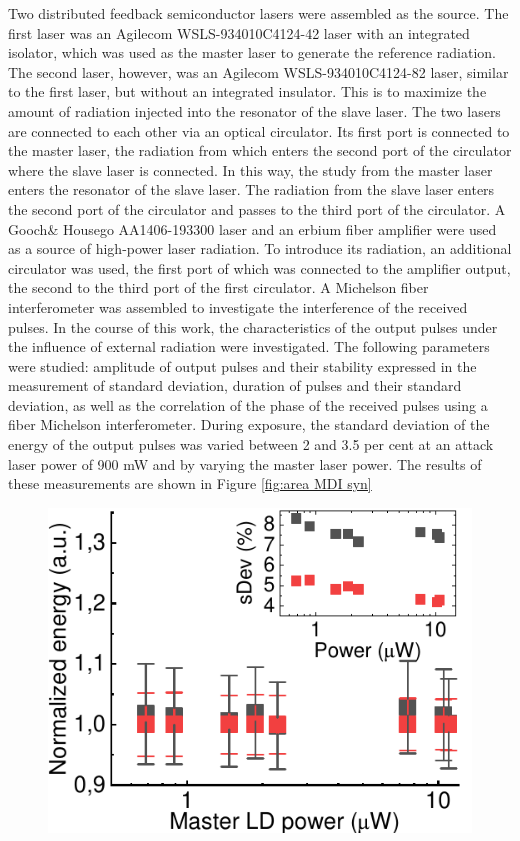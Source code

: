{Two distributed feedback semiconductor lasers were assembled as the source. The first laser was an Agilecom WSLS-934010C4124-42 laser with an integrated isolator, which was used as the master laser to generate the reference radiation. The second laser, however, was an Agilecom WSLS-934010C4124-82 laser, similar to the first laser, but without an integrated insulator. This is to maximize the amount of radiation injected into the resonator of the slave laser. The two lasers are connected to each other via an optical circulator. Its first port is connected to the master laser, the radiation from which enters the second port of the circulator where the slave laser is connected. In this way, the study from the master laser enters the resonator of the slave laser. The radiation from the slave laser enters the second port of the circulator and passes to the third port of the circulator. A Gooch\& Housego AA1406-193300 laser and an erbium fiber amplifier were used as a source of high-power laser radiation. To introduce its radiation, an additional circulator was used, the first port of which was connected to the amplifier output, the second to the third port of the first circulator. A Michelson fiber interferometer was assembled to investigate the interference of the received pulses.
\newline In the course of this work, the characteristics of the output pulses under the influence of external radiation were investigated. The following parameters were studied: amplitude of output pulses and their stability expressed in the measurement of standard deviation, duration of pulses and their standard deviation, as well as the correlation of the phase of the received pulses using a fiber Michelson interferometer. During exposure, the standard deviation of the energy of the output pulses was varied between 2 and 3.5 per cent at an attack laser power of 900 mW and by varying the master laser power. The results of these measurements are shown in Figure \ref{fig:area MDI syn}
\begin{figure}
    \centering
    \includegraphics{images/area_under_attack.pdf}

\end{figure}}
